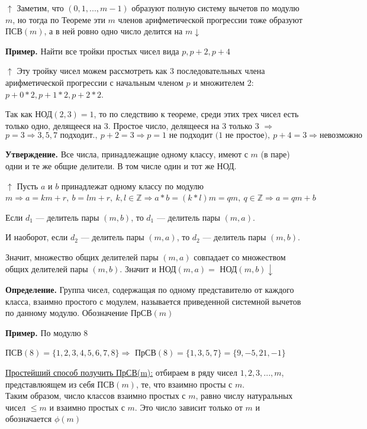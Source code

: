 \documentclass{article}
\begin{document}
            $\uparrow$ Заметим, что $(0,1,...,m - 1)$ образуют полную систему вычетов по модулю $m$, но тогда по Теореме эти $m$ членов арифметической прогрессии тоже образуют $\textrm{ПСВ}(m)$, а в ней ровно одно число делится на $m \downarrow$
            
            \textbf{Пример.} Найти все тройки простых чисел вида $p, p + 2, p + 4$
            
            $\uparrow$ Эту тройку чисел можем рассмотреть как 3 последовательных члена арифметической прогрессии с начальным членом $p$ и множителем 2: $p + 0*2, p + 1*2, p + 2*2$.
            
            Так как $\textrm{НОД}(2,3) = 1$, то по следствию к теореме, среди этих трех чисел есть только одно, делящееся на 3. Простое число, делящееся на 3 только 3 $\Rightarrow$
            \[ p = 3 \Rightarrow 3, 5, 7 \textrm{ подходит.},\ p + 2 = 3 \Rightarrow p = 1 \textrm{ не подходит (1 не простое)},\ p + 4 = 3 \Rightarrow \textrm{невозможно} \]
    		
            \textbf{Утверждение.} Все числа, принадлежащие одному классу, имеют с $m$ (в паре) одни и те же общие делители. В том числе один и тот же НОД.
            
            $\uparrow$ Пусть $a$ и $b$ принадлежат одному классу по модулю $m \Rightarrow a = km + r,\ b = lm + r,\ k,l \in \mathbb{Z} \Rightarrow a*b = (k*l)m = qm,\ q \in \mathbb{Z} \Rightarrow a = qm + b$  
            
            Если $d_1$ --- делитель пары $(m, b)$, то $d_1$ --- делитель пары $(m, a)$.
            
            И наоборот, если $d_2$ --- делитель пары $(m, a)$, то $d_2$ --- делитель пары $(m, b)$.
            
            Значит, множество общих делителей пары $(m, a)$ совпадает со множеством общих делителей пары $(m, b)$. Значит и НОД$(m, a) = $ НОД$(m, b) \downarrow$ 
            
            \textbf{Определение.} Группа чисел, содержащая по одному представителю от каждого класса, взаимно простого с модулем, называется приведенной системной вычетов по данному модулю. Обозначение ПрСВ$(m)$
            
            \textbf{Пример.} По модулю 8
            
            ПСВ$(8) = \{1, 2, 3, 4, 5, 6, 7, 8\} \Rightarrow$ ПрСВ$(8) = \{1,3,5,7\} = \{9, -5, 21, -1\}$
            
            \underline{Простейший способ получить ПрСВ(m):} отбираем в ряду чисел $1,2,3,...,m$, представлюящем из себя ПСВ$(m)$, те, что взаимно просты с $m$.\\
            Таким образом, число классов взаимно простых с $m$, равно числу натуральных чисел $\leq m$ и взаимно простых с $m$. Это число зависит только от $m$ и обозначается $\phi(m)$
        
\end{document}

